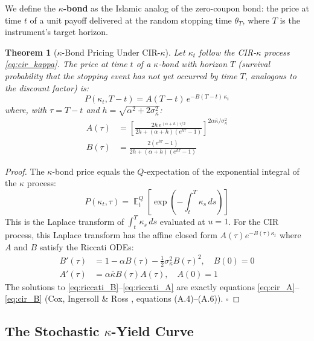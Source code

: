 \documentclass[10pt,twocolumn]{article}
\theoremstyle{plain}
\newtheorem{theorem}{Theorem}
\theoremstyle{definition}
\DeclareMathOperator{\E}{\mathbb{E}}
\begin{document}
We define the \textbf{$\kappa$-bond} as the Islamic analog of
the zero-coupon bond: the price at time $t$ of a unit payoff
delivered at the random stopping time $\theta_T$, where
$T$ is the instrument's target horizon.

\begin{theorem}[$\kappa$-Bond Pricing Under CIR-$\kappa$]
\label{thm:kappa_bond}
Let $\kappa_t$ follow the CIR-$\kappa$ process
\eqref{eq:cir_kappa}. The price at time $t$ of a $\kappa$-bond
with horizon $T$ (survival probability that the stopping event
has not yet occurred by time $T$, analogous to the discount
factor) is:
\begin{equation}
P(\kappa_t, T-t) = A(T-t)\,e^{-B(T-t)\,\kappa_t}
\label{eq:kappa_bond_cir}
\end{equation}
where, with $\tau = T - t$ and $h = \sqrt{\alpha^2 + 2\sigma_\kappa^2}$:
\begin{align}
A(\tau) &= \left[\frac{2h\,e^{(\alpha+h)\tau/2}}
{2h + (\alpha+h)(e^{h\tau}-1)}\right]^{2\alpha\bar\kappa/\sigma_\kappa^2}
\label{eq:cir_A}\\[6pt]
B(\tau) &= \frac{2(e^{h\tau}-1)}
{2h + (\alpha+h)(e^{h\tau}-1)}
\label{eq:cir_B}
\end{align}
\end{theorem}

\begin{proof}
The $\kappa$-bond price equals the $Q$-expectation of the
exponential integral of the $\kappa$ process:
\begin{equation}
P(\kappa_t, \tau) = \E^Q_t\!\left[
\exp\!\left(-\int_t^{T} \kappa_s\,ds\right)
\right]
\label{eq:kappa_survival}
\end{equation}
This is the Laplace transform of $\int_t^T \kappa_s\,ds$ evaluated
at $u = 1$. For the CIR process, this Laplace transform has the
affine closed form $A(\tau)e^{-B(\tau)\kappa_t}$ where $A$ and
$B$ satisfy the Riccati ODEs:
\begin{align}
B'(\tau) &= 1 - \alpha B(\tau) - \tfrac{1}{2}\sigma_\kappa^2 B(\tau)^2,
\quad B(0) = 0
\label{eq:riccati_B}\\
A'(\tau) &= \alpha\bar\kappa B(\tau) A(\tau), \quad A(0) = 1
\label{eq:riccati_A}
\end{align}
The solutions to \eqref{eq:riccati_B}--\eqref{eq:riccati_A}
are exactly equations \eqref{eq:cir_A}--\eqref{eq:cir_B}
(Cox, Ingersoll \& Ross \cite{CIR1985}, equations (A.4)--(A.6)).
\qquad$\square$
\end{proof}

\subsection{The Stochastic $\kappa$-Yield Curve}
\end{document}
